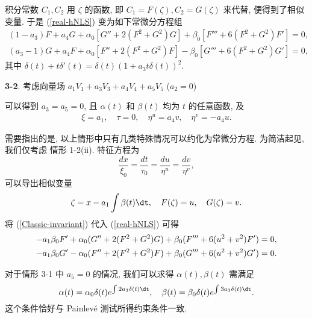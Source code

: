 积分常数 $C_1, C_2$ 用 $\zeta$ 的函数, 即 $C_1=F(\zeta), C_2=G(\zeta)$ 来代替, 便得到了相似变量. 于是 (\ref{real-hNLS}) 变为如下常微分方程组
\begin{equation}
\begin{aligned}
(1-a_3)F+a_4G+\alpha_0[G''+2(F^2+G^2)G]+\beta_0[F'''+6(F^2+G^2)F']=0,\\
(a_3-1)G+a_4F+\alpha_0[F''+2(F^2+G^2)F]-\beta_0[G'''+6(F^2+G^2)G']=0,
\end{aligned}
\end{equation}
其中 $\delta(t)+t\delta'(t)=\delta(t)(1+a_3t\delta(t))^2$.

\textbf{3-2}. 考虑向量场 $a_1 V_1+a_3 V_3+a_4 V_4+a_5 V_5$ ($a_2= 0$)

可以得到 $a_3=a_5=0$, 且 $\alpha(t)$ 和 $\beta(t)$ 均为 $t$ 的任意函数, 及
\begin{align*}
\xi=a_1,\quad \tau=0,\quad \eta^u=a_4v,\quad \eta^v=-a_4u.
\end{align*}

需要指出的是, 以上情形中只有几类特殊情况可以约化为常微分方程. 为简洁起见, 我们仅考虑
情形 1-2(ii).
特征方程为
\begin{equation*}
\frac{dx}{\xi_0}=\frac{dt}{\tau_0}=\frac{du}{\eta^u}=\frac{dv}{\eta^v},
\end{equation*}
可以导出相似变量
\begin{align}\label{Classic-invariant}
\zeta=x-a_1\int\beta(t)\dt,\quad F(\zeta)=u,\quad G(\zeta)=v .
\end{align}
将 (\ref{Classic-invariant}) 代入 (\ref{real-hNLS}) 可得
\begin{align}
-a_1\beta_0F'+\alpha_0(G''+2(F^2+G^2)G)+\beta_0(F'''+6(u^2+v^2)F')=0,\notag\\
-a_1\beta_0G'-\alpha_0(F''+2(F^2+G^2)F)+\beta_0(G'''+6(u^2+v^2)G')=0.
\end{align}

对于情形 3-1 中 $a_5=0$ 的情况, 我们可以求得 $\alpha(t), \beta(t)$ 需满足
\begin{equation}
\alpha(t)=\alpha_0\delta(t)e^{\int2a_3\delta(t)\dt},\quad \beta(t)=\beta_0\delta(t)e^{\int3a_3\delta(t)\dt}.
\end{equation}
这个条件恰好与 Painlev\'{e} 测试所得约束条件一致.



